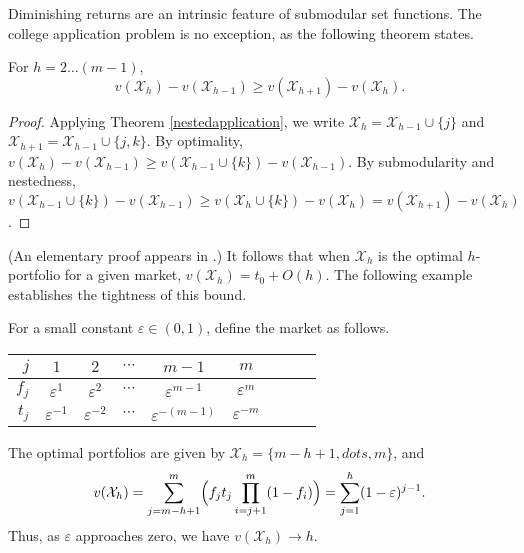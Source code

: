 Diminishing returns are an intrinsic feature of submodular set functions. The college application problem is no exception, as the following theorem states.

\begin{theorem} \label{concavityinh}
For $h = 2 \dots (m-1)$,
\begin{equation*}
v(\mathcal{X}_h) - v(\mathcal{X}_{h-1}) \geq v(\mathcal{X}_{h+1}) - v(\mathcal{X}_{h}).
\end{equation*} 
\end{theorem}

\begin{proof}
Applying Theorem \ref{nestedapplication}, we write $\mathcal{X}_h = \mathcal{X}_{h-1} \cup\{j\}$ and $\mathcal{X}_{h+1} = \mathcal{X}_{h-1} \cup\{j, k\}$. By optimality, $v(\mathcal{X}_h) - v(\mathcal{X}_{h-1}) \geq v(\mathcal{X}_{h-1}\cup\{k\}) - v(\mathcal{X}_{h-1})$. By submodularity and nestedness, $v(\mathcal{X}_{h-1}\cup\{k\}) - v(\mathcal{X}_{h-1}) \geq  v(\mathcal{X}_{h}\cup\{k\}) - v(\mathcal{X}_{h}) = v(\mathcal{X}_{h+1}) - v(\mathcal{X}_{h})$.
\end{proof}

\noindent (An elementary proof appears in \cite{kapur2022}.) It follows that when $\mathcal{X}_h$ is the optimal $h$-portfolio for a given market, $v(\mathcal{X}_h) = t_0 + O(h)$. The following example establishes the tightness of this bound.

\begin{example} \label{tightexampleforconcavity}
For a small constant $\varepsilon \in (0, 1)$, define the market as follows.
\begin{center}
\begin{tabular}{r|cccccccc}
$j$   & $1$ & $2$ & $\cdots$ & $m-1$ & $m$ \\ \hline
$f_j$ & $\varepsilon^{1}$ & $\varepsilon^{2}$ & $\cdots$ & $\varepsilon^{m-1}$ & $\varepsilon^{m}$ \\
$t_j$ & $\varepsilon^{-1}$ & $\varepsilon^{-2}$ & $\cdots$ & $\varepsilon^{-(m-1)}$ & $\varepsilon^{-m}$
\end{tabular}%
\end{center}
The optimal portfolios are given by $\mathcal{X}_h = \{m-h + 1, dots, m\}$, and 
\begin{equation*}
v(\mathcal{X}_h) = \sum_{j= m-h +1}^m \Bigl( f_j t_j \prod_{i = j+1}^m (1 - f_{i}) \Bigr) =  \sum_{j= 1}^h  (1 - \varepsilon)^{j-1}.
\end{equation*}
Thus, as $\varepsilon$ approaches zero, we have $v(\mathcal{X}_h) \to h$.
\end{example}

